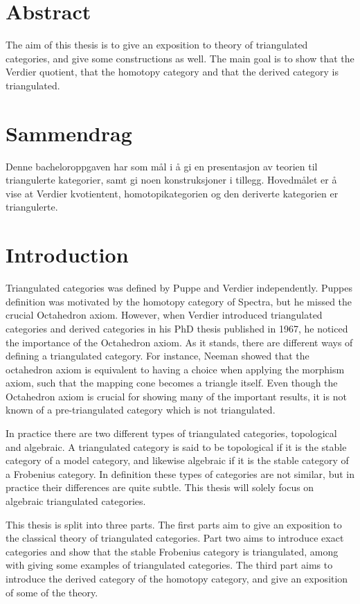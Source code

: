 \chapter*{Abstract}
    The aim of this thesis is to give an exposition to theory of triangulated categories, and give some constructions as well. The main goal is to show that the Verdier quotient, that the homotopy category and that the derived category is triangulated.

\chapter*{Sammendrag}
    Denne bacheloroppgaven har som mål i å gi en presentasjon av teorien til triangulerte kategorier, samt gi noen konstruksjoner i tillegg. Hovedmålet er å vise at Verdier kvotientent, homotopikategorien og den deriverte kategorien er triangulerte.

\chapter*{Introduction}

    Triangulated categories was defined by Puppe and Verdier independently. Puppes definition was motivated by the homotopy category of Spectra, but he missed the crucial Octahedron axiom. However, when Verdier introduced triangulated categories and derived categories in his PhD thesis published in 1967, he noticed the importance of the Octahedron axiom. As it stands, there are different ways of defining a triangulated category. For instance, Neeman showed that the octahedron axiom is equivalent to having a choice when applying the morphism axiom, such that the mapping cone becomes a triangle itself. Even though the Octahedron axiom is crucial for showing many of the important results, it is not known of a pre-triangulated category which is not triangulated.
    
    In practice there are two different types of triangulated categories, topological and algebraic. A triangulated category is said to be topological if it is the stable category of a model category, and likewise algebraic if it is the stable category of a Frobenius category. In definition these types of categories are not similar, but in practice their differences are quite subtle. This thesis will solely focus on algebraic triangulated categories.

    This thesis is split into three parts. The first parts aim to give an exposition to the classical theory of triangulated categories. Part two aims to introduce exact categories and show that the stable Frobenius category is triangulated, among with giving some examples of triangulated categories. The third part aims to introduce the derived category of the homotopy category, and give an exposition of some of the theory.

